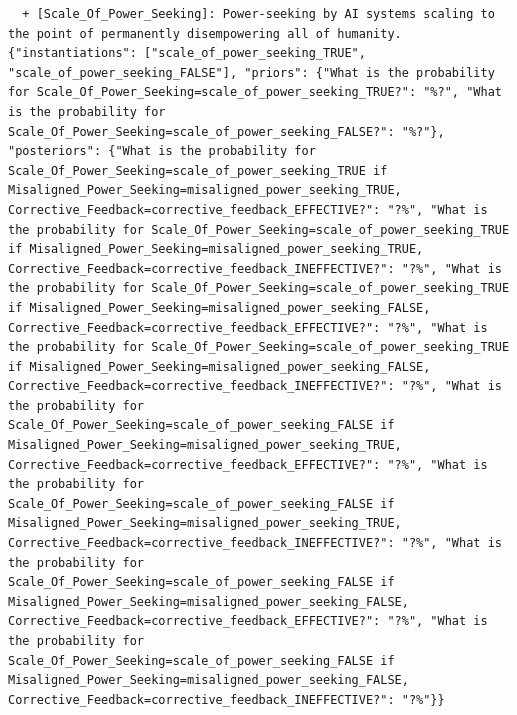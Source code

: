 \documentclass[
  11pt,
  letterpaper,
]{book}
\begin{document}
\begin{verbatim}
  + [Scale_Of_Power_Seeking]: Power-seeking by AI systems scaling to the point of permanently disempowering all of humanity. {"instantiations": ["scale_of_power_seeking_TRUE", "scale_of_power_seeking_FALSE"], "priors": {"What is the probability for Scale_Of_Power_Seeking=scale_of_power_seeking_TRUE?": "%?", "What is the probability for Scale_Of_Power_Seeking=scale_of_power_seeking_FALSE?": "%?"}, "posteriors": {"What is the probability for Scale_Of_Power_Seeking=scale_of_power_seeking_TRUE if Misaligned_Power_Seeking=misaligned_power_seeking_TRUE, Corrective_Feedback=corrective_feedback_EFFECTIVE?": "?%", "What is the probability for Scale_Of_Power_Seeking=scale_of_power_seeking_TRUE if Misaligned_Power_Seeking=misaligned_power_seeking_TRUE, Corrective_Feedback=corrective_feedback_INEFFECTIVE?": "?%", "What is the probability for Scale_Of_Power_Seeking=scale_of_power_seeking_TRUE if Misaligned_Power_Seeking=misaligned_power_seeking_FALSE, Corrective_Feedback=corrective_feedback_EFFECTIVE?": "?%", "What is the probability for Scale_Of_Power_Seeking=scale_of_power_seeking_TRUE if Misaligned_Power_Seeking=misaligned_power_seeking_FALSE, Corrective_Feedback=corrective_feedback_INEFFECTIVE?": "?%", "What is the probability for Scale_Of_Power_Seeking=scale_of_power_seeking_FALSE if Misaligned_Power_Seeking=misaligned_power_seeking_TRUE, Corrective_Feedback=corrective_feedback_EFFECTIVE?": "?%", "What is the probability for Scale_Of_Power_Seeking=scale_of_power_seeking_FALSE if Misaligned_Power_Seeking=misaligned_power_seeking_TRUE, Corrective_Feedback=corrective_feedback_INEFFECTIVE?": "?%", "What is the probability for Scale_Of_Power_Seeking=scale_of_power_seeking_FALSE if Misaligned_Power_Seeking=misaligned_power_seeking_FALSE, Corrective_Feedback=corrective_feedback_EFFECTIVE?": "?%", "What is the probability for Scale_Of_Power_Seeking=scale_of_power_seeking_FALSE if Misaligned_Power_Seeking=misaligned_power_seeking_FALSE, Corrective_Feedback=corrective_feedback_INEFFECTIVE?": "?%"}}

\end{verbatim}
\end{document}
